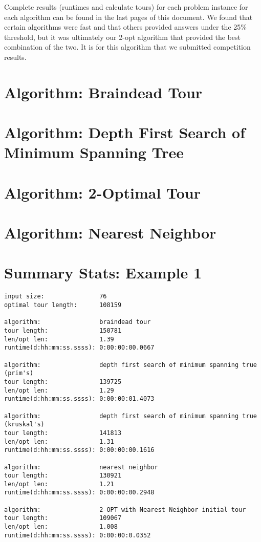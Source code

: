 \documentclass[12pt]{article}
\begin{document}
Complete results (runtimes and calculate tours) for each problem instance for each algorithm can be found in the last pages of this document.  We found that certain algorithms were fast and that others provided answers under the 25\% threshold, but it was ultimately our 2-opt algorithm that provided the best combination of the two.  It is for this algorithm that we submitted competition results.

\newpage
\section*{Algorithm: Braindead Tour}


\newpage
\section*{Algorithm: Depth First Search of Minimum Spanning Tree}


\newpage
\section*{Algorithm: 2-Optimal Tour}


\newpage
\section*{Algorithm: Nearest Neighbor}


\newpage
\section*{Summary Stats: Example 1}
\begin{verbatim}
input size:               76
optimal tour length:      108159

algorithm:                braindead tour
tour length:              150781
len/opt len:              1.39
runtime(d:hh:mm:ss.ssss): 0:00:00:00.0667

algorithm:                depth first search of minimum spanning true (prim's) 
tour length:              139725
len/opt len:              1.29
runtime(d:hh:mm:ss.ssss): 0:00:00:01.4073

algorithm:                depth first search of minimum spanning true (kruskal's) 
tour length:              141813
len/opt len:              1.31
runtime(d:hh:mm:ss.ssss): 0:00:00:00.1616

algorithm:                nearest neighbor 
tour length:              130921
len/opt len:              1.21
runtime(d:hh:mm:ss.ssss): 0:00:00:00.2948

algorithm:                2-OPT with Nearest Neighbor initial tour
tour length:              109067
len/opt len:              1.008
runtime(d:hh:mm:ss.ssss): 0:00:00:0.0352
\end{verbatim}
\end{document}
